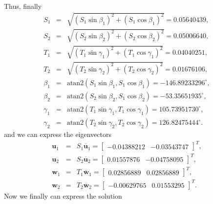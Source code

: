 \documentclass [12pt, a4paper] {article}
\newcommand{\vc}[1]
{
	\boldsymbol{#1}
}
\begin{document}
Thus, finally 
\begin {eqnarray}
    S_1 &=& \sqrt{(S_1\sin\beta_1)^2 + (S_1\cos\beta_1)^2} = 0.05640439,
    \\
    S_2 &=& \sqrt{(S_2\sin\beta_2)^2 + (S_2\cos\beta_2)^2} = 0.05006640,
    \\ 
    T_1 &=& \sqrt{(T_1\sin\gamma_1)^2 + (T_1\cos\gamma_1)^2} = 0.04040251,
    \\ 
    T_2 &=& \sqrt{(T_2\sin\gamma_2)^2 + (T_2\cos\gamma_2)^2} = 0.01676106,
    \\
    \beta_1 &=& \textrm{atan2}(S_1\sin\beta_1, S_1\cos\beta_1) = -146.89233296^\circ,
    \\
    \beta_2 &=& \textrm{atan2}(S_2\sin\beta_2, S_1\cos\beta_2) = -53.35651935^\circ,
    \\
    \gamma_1 &=& \textrm{atan2}(T_1\sin\gamma_1, T_1\cos\gamma_1) = 105.73951730^\circ,
    \\
    \gamma_2 &=& \textrm{atan2}(T_2\sin\gamma_2, T_2\cos\gamma_2) = 126.82475444^\circ.
\end {eqnarray}
and we can express the eigenvectors 
\begin {eqnarray}
    \vc u_1 
    &=& 
    S_1 \overline{\vc u}_1
    =
    \begin {bmatrix}
        -0.04388212 & -0.03543747
    \end{bmatrix}^T,
    \\
    \vc u_2 
    &=& 
    S_2 \overline{\vc u}_2
    =
    \begin {bmatrix}
        0.01557876 & -0.04758095
    \end{bmatrix}^T,
    \\
    \vc w_1 
    &=& 
    T_1 \overline{\vc w}_1
    =
    \begin {bmatrix}
        0.02856889 & 0.02856889
    \end{bmatrix}^T,
    \\
    \vc w_2
    &=& 
    T_2 \overline{\vc w}_2
    =
    \begin {bmatrix}
        -0.00629765 & 0.01553295
    \end{bmatrix}^T.
\end {eqnarray}
Now we finally can express the solution 
\end{document}
